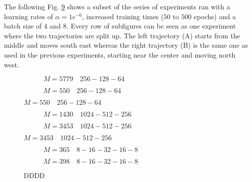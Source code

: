 \par
The following Fig. \ref{fig:double} shows a subset of the series of experiments ran with a learning rates of $\alpha=1e^{-6}$, increased training times ($50$ to $500$ epochs) and a batch size of $4$ and $8$. Every row of subfigures can be seen as one experiment where the two trajectories are split up. The left trajectory (A) starts from the middle and moves south east whereas the right trajectory (B) is the same one as used in the previous experiments, starting near the center and moving north west.
\begin{figure}[H]
     \centering
     \begin{subfigure}[b]{0.48\textwidth}
         \centering
             
         \caption{$M=5779  \quad 256-128-64$}
         \label{fig:double3}
     \end{subfigure}
          \hfill
               \begin{subfigure}[b]{0.48\textwidth}
         \centering
             
         \caption{$M=550 \quad 256-128-64$}
         \label{fig:double4}
     \end{subfigure}
\end{figure}
\begin{figure}[H]\ContinuedFloat
     \begin{subfigure}[b]{0.48\textwidth}
         \centering
       
         \caption{$M=1430  \quad 1024-512-256$}
         \label{fig:double1}
     \end{subfigure}
     \hfill
     \begin{subfigure}[b]{0.48\textwidth}
         \centering
             
         \caption{$M=3453  \quad 1024-512-256 $}
         \label{fig:double2}
     \end{subfigure}
\end{figure}
\begin{figure}[H]\ContinuedFloat
     \begin{subfigure}[b]{0.48\textwidth}
         \centering
             
         \caption{$M=365 \quad 8-16-32-16-8$}
         \label{fig:double5}
     \end{subfigure}
               \hfill
     \begin{subfigure}[b]{0.48\textwidth}
         \centering
             
         \caption{$M=398 \quad 8-16-32-16-8$}
         \label{fig:double6}
     \end{subfigure}
     \label{fig:double}
     \caption{DDDD}
\end{figure}

